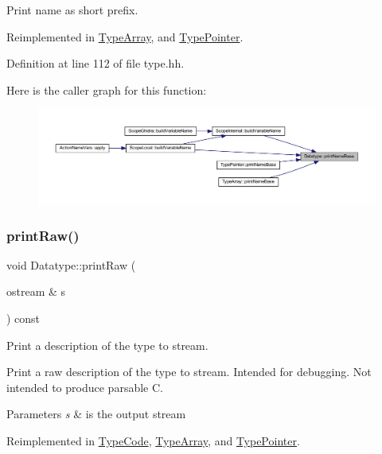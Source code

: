 Print name as short prefix. 



Reimplemented in \mbox{\hyperlink{class_type_array_aa3c9c83ca86e94bb58772d9933d88617}{Type\+Array}}, and \mbox{\hyperlink{class_type_pointer_a843f2ebe62187fe48a0f3d1b9bd9c10b}{Type\+Pointer}}.



Definition at line 112 of file type.\+hh.

Here is the caller graph for this function\+:
\nopagebreak
\begin{figure}[H]
\begin{center}
\leavevmode
\includegraphics[width=350pt]{class_datatype_aec50467c2d81d22daf052a95e283a24a_icgraph}
\end{center}
\end{figure}
\mbox{\label{class_datatype_a034a9b665df1a06f17fd3dfe61e7bf41}} 
\subsubsection{\texorpdfstring{printRaw()}{printRaw()}}
{\footnotesize\ttfamily void Datatype\+::print\+Raw (\begin{DoxyParamCaption}\item[{ostream \&}]{s }\end{DoxyParamCaption}) const\hspace{0.3cm}{\ttfamily [virtual]}}



Print a description of the type to stream. 

Print a raw description of the type to stream. Intended for debugging. Not intended to produce parsable C. 
\begin{DoxyParams}{Parameters}
{\em s} & is the output stream \\
\hline
\end{DoxyParams}


Reimplemented in \mbox{\hyperlink{class_type_code_a1e8d400271941042d3dcb8402876ce02}{Type\+Code}}, \mbox{\hyperlink{class_type_array_a16a9d1e80de3beda0a101b7942dc1f77}{Type\+Array}}, and \mbox{\hyperlink{class_type_pointer_a0aece76a1fd245a58d75136ca81fca1b}{Type\+Pointer}}.



